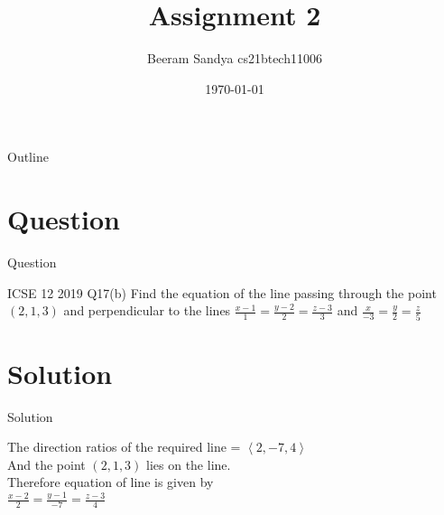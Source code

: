 \documentclass{beamer}
\title{Assignment 2}
\author{Beeram Sandya cs21btech11006}
\date{\today}
\begin{document}
\begin{frame}
    \titlepage 
\end{frame}

\logo{}


\begin{frame}{Outline}
    \tableofcontents
\end{frame}


\section{Question}
\begin{frame}{Question}
\begin{block}{ICSE 12 2019 Q17(b)}
Find the equation of the line passing through the point $\left(2,1,3\right)$ and perpendicular to the lines $\frac{x-1}{1}=\frac{y-2}{2}=\frac{z-3}{3}$ and $\frac{x}{-3}=\frac{y}{2}=\frac{z}{5}$
\end{block}
\end{frame}


\section{Solution}
\begin{frame}{Solution}
    
The direction ratios of the required line = $\left<2,-7,4\right>$\\
And the point $\left(2,1,3\right)$ lies on the line.\\
Therefore equation of line is given by\\
$\frac{x-2}{2}=\frac{y-1}{-7}=\frac{z-3}{4}$

    
\end{frame} 
\end{document}
